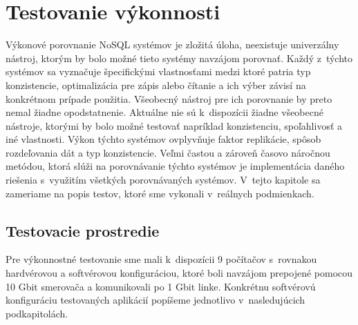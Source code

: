 \documentclass[11pt,twoside,a4paper]{book}
\begin{document}
% 
% 



% 
% 
% 
% 
% 
% 
% 


\chapter{Testovanie výkonnosti}
\label{chapter:testovanie}

Výkonové porovnanie NoSQL systémov je zložitá úloha, neexistuje univerzálny nástroj, ktorým by bolo možné tieto systémy navzájom porovnať. 
Každý z~týchto systémov sa vyznačuje špecifickými vlastnosťami medzi ktoré patria typ konzistencie, optimalizácia pre zápis alebo čítanie a ich výber závisí na konkrétnom prípade použitia. Všeobecný nástroj pre ich porovnanie by preto nemal žiadne opodstatnenie. Aktuálne nie sú k~dispozícii žiadne všeobecné nástroje, ktorými by bolo možné testovať napríklad konzistenciu, spoľahlivosť a iné vlastnosti. Výkon týchto systémov ovplyvňuje faktor replikácie, spôsob rozdeľovania dát a typ konzistencie. Veľmi častou a zároveň časovo náročnou metódou, ktorá slúži na porovnávanie týchto systémov je implementácia daného riešenia s~využitím všetkých porovnávaných systémov. V~tejto kapitole sa zameriame na popis testov, ktoré sme vykonali v~reálnych podmienkach.



\section{Testovacie prostredie}

Pre výkonnostné testovanie sme mali k~dispozícii 9 počítačov s~rovnakou hardvérovou a softvérovou konfiguráciou, ktoré boli navzájom prepojené pomocou 10 Gbit smerovača a komunikovali po 1 Gbit linke. Konkrétnu softvérovú konfiguráciu testovaných aplikácií popíšeme jednotlivo v~nasledujúcich podkapitolách.
\end{document}
